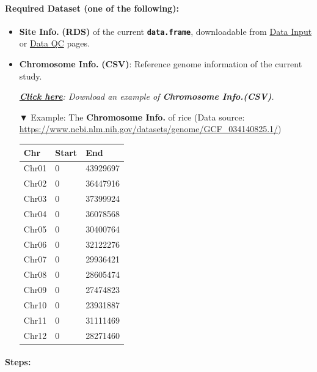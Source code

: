 \documentclass[
]{book}
\begin{document}
\paragraph*{Required Dataset (one of the following):}\label{required-dataset-one-of-the-following-3}

\begin{itemize}
\item
  \textbf{Site Info.} \textbf{(RDS)} of the current \textbf{\texttt{data.frame}}, downloadable from \ul{Data Input} or \ul{Data QC} pages.
\item
  \textbf{Chromosome Info.} \textbf{(CSV)}: Reference genome information of the current study.

  \href{https://drive.google.com/file/d/1gIEba13YizQ14IU8gPYj8q57C3urTUpa/view?usp=drive_link}{\textbf{\emph{Click here}}}\emph{: Download an example of \textbf{Chromosome Info.(CSV)}.}

  ▼ Example: The \textbf{Chromosome Info.} of rice (Data source: \url{https://www.ncbi.nlm.nih.gov/datasets/genome/GCF_034140825.1/})

  \begin{longtable}[]{@{}lll@{}}
  \toprule\noalign{}
  Chr & Start & End \\
  \midrule\noalign{}
  \endhead
  \bottomrule\noalign{}
  \endlastfoot
  Chr01 & 0 & 43929697 \\
  Chr02 & 0 & 36447916 \\
  Chr03 & 0 & 37399924 \\
  Chr04 & 0 & 36078568 \\
  Chr05 & 0 & 30400764 \\
  Chr06 & 0 & 32122276 \\
  Chr07 & 0 & 29936421 \\
  Chr08 & 0 & 28605474 \\
  Chr09 & 0 & 27474823 \\
  Chr10 & 0 & 23931887 \\
  Chr11 & 0 & 31111469 \\
  Chr12 & 0 & 28271460 \\
  \end{longtable}
\end{itemize}

\paragraph*{Steps:}\label{steps}
\end{document}
